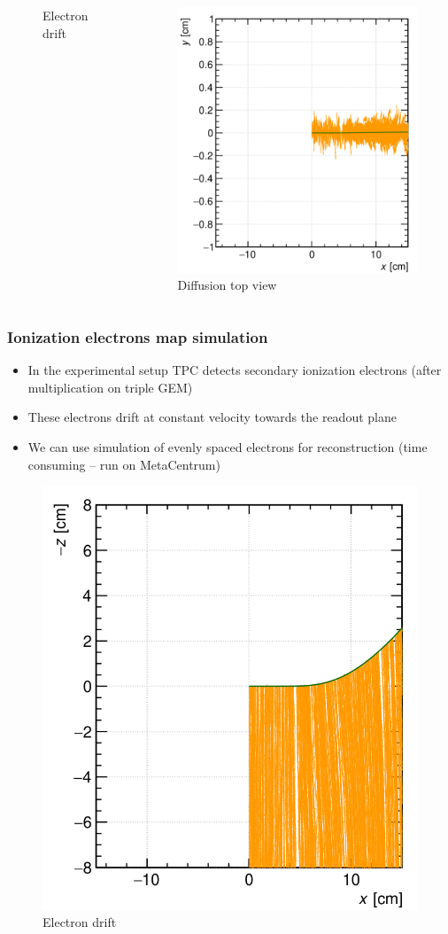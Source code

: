 \documentclass{beamer}
\begin{document}
\begin{frame}
\begin{columns}
\begin{figure}
				\caption{Electron drift}
			\end{figure}
			\begin{figure}
				\centering
				\includegraphics[width = 0.95 \linewidth]{images/track3.png}
				\caption{Diffusion top view}
			\end{figure}
		\end{columns}
	\end{frame}
	
	\begin{frame}
		\frametitle{Ionization electrons map simulation}
		\begin{itemize}
			\item In the experimental setup TPC detects secondary ionization electrons (after multiplication on triple GEM)
			\item These electrons drift at constant velocity towards the readout plane
			\item We can use simulation of evenly spaced electrons for reconstruction (time consuming -- run on MetaCentrum)
		\end{itemize}
		\begin{figure}
			\centering
			\includegraphics[width = 0.3 \linewidth]{images/track2.png}
			\caption{Electron drift}
		\end{figure}
	\end{frame}
	
\end{document}
